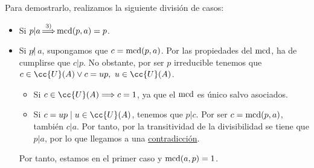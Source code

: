\begin{enumerate}
    Para demostrarlo, realizamos la siguiente división de casos:
    \begin{itemize}
        \item Si $\displaystyle p|a \mathop{\Longrightarrow}^{3)} \operatorname{mcd}(p,a)=p$.

        \item Si  $p\not|~a$, supongamos que $c=\operatorname{mcd}(p,a)$. Por las propiedades del $\operatorname{mcd}$, ha de cumplirse que $c|p$. No obstante, por ser $p$ irreducible tenemos que $c\in \cc{U}(A)\lor c=up,~u\in \cc{U}(A)$.
        \begin{itemize}
            \item Si $c\in \cc{U}(A)\Longrightarrow c=1$, ya que el $\operatorname{mcd}$ es único salvo asociados.
            \item Si $c=up\mid u\in \cc{U}(A)$, tenemos que $p|c$. Por ser $c=\operatorname{mcd}(p,a)$, también $c|a$. Por tanto, por la transitividad de la divisibilidad se tiene que $p|a$, por lo que llegamos a una \ul{contradicción}.
        \end{itemize}
        Por tanto, estamos en el primer caso y $\operatorname{mcd}(a,p)=1$.
    \end{itemize}
\end{enumerate}

